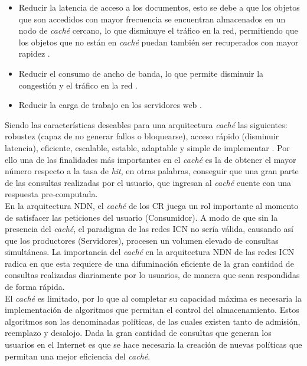 \documentclass[12pt]{ociamthesis}  %
\begin{document}
\begin{itemize}
	
	\item Reducir la latencia de acceso a los documentos, esto se debe a que los objetos que son accedidos con mayor frecuencia se encuentran almacenados en un nodo de \textit{caché} cercano, lo que disminuye el tráfico en la red, permitiendo que los objetos que no están en \textit{caché} puedan también ser recuperados con mayor rapidez \cite{wang1999survey}.
	
	\item Reducir el consumo de ancho de banda, lo que permite disminuir la congestión y el tráfico en la red \cite{wang1999survey}.
	
	\item Reducir la carga de trabajo en los servidores web \cite{wang1999survey}.
	
\end{itemize}

Siendo las características deseables para una arquitectura \textit{caché} las siguientes: robustez (capaz de no generar fallos o bloquearse), acceso rápido (disminuir latencia), eficiente, escalable, estable, adaptable y simple de implementar \cite{wang1999survey}. Por ello una de las finalidades más importantes en el \textit{caché} es la de obtener el mayor número respecto a la tasa de \textit{hit}, en otras palabras, conseguir que una gran parte de las consultas realizadas por el usuario, que ingresan al \textit{caché} cuente con una respuesta pre-computada.\\

En la arquitectura NDN, el \textit{caché} de los CR juega un rol importante al momento de satisfacer las peticiones del usuario (Consumidor). A modo de que sin la presencia del \textit{caché}, el paradigma de las redes ICN no sería válida, causando así que los productores (Servidores), procesen un volumen elevado de consultas simultáneas. La importancia del \textit{caché} en la arquitectura NDN de las redes ICN radica en que esta requiere de una difuminación eficiente de la gran cantidad de consultas realizadas diariamente por lo usuarios, de manera que sean respondidas de forma rápida.\\

El \textit{caché} es limitado, por lo que al completar su capacidad máxima es necesaria la  implementación de algoritmos que permitan el control del almacenamiento. Estos algoritmos son las denominadas políticas, de las cuales existen tanto de admisión, reemplazo y desalojo. Dada la gran cantidad de consultas que generan los usuarios en el Internet es que se hace necesaria la creación de nuevas políticas que permitan una mejor eficiencia del \textit{caché}.\\
\end{document}
